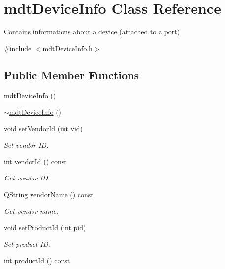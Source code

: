 \hypertarget{classmdt_device_info}{\section{mdt\-Device\-Info Class Reference}
\label{classmdt_device_info}
}


Contains informations about a device (attached to a port)  




{\ttfamily \#include $<$mdt\-Device\-Info.\-h$>$}

\subsection*{Public Member Functions}
\begin{DoxyCompactItemize}
\item 
\hyperlink{classmdt_device_info_a9840a53606717042a03e5268d8a8d7a6}{mdt\-Device\-Info} ()
\item 
\hyperlink{classmdt_device_info_a3ebe3e1c5e3a9954488147d1145ea406}{$\sim$mdt\-Device\-Info} ()
\item 
void \hyperlink{classmdt_device_info_a3b56cda14d31f3288353480a15731ebb}{set\-Vendor\-Id} (int vid)
\begin{DoxyCompactList}\small\item\em Set vendor I\-D. \end{DoxyCompactList}\item 
int \hyperlink{classmdt_device_info_a45edf71f1fa6a653c1bfa984e90e094e}{vendor\-Id} () const 
\begin{DoxyCompactList}\small\item\em Get vendor I\-D. \end{DoxyCompactList}\item 
Q\-String \hyperlink{classmdt_device_info_a207d7b6b49fd65726232e95cd9e0568c}{vendor\-Name} () const 
\begin{DoxyCompactList}\small\item\em Get vendor name. \end{DoxyCompactList}\item 
void \hyperlink{classmdt_device_info_a91ca6f02bfe86656073599c8d3d79da7}{set\-Product\-Id} (int pid)
\begin{DoxyCompactList}\small\item\em Set product I\-D. \end{DoxyCompactList}\item 
int \hyperlink{classmdt_device_info_a53006d4fbaeb0ba2fd47057f36b9b813}{product\-Id} () const 

\end{DoxyCompactItemize}
